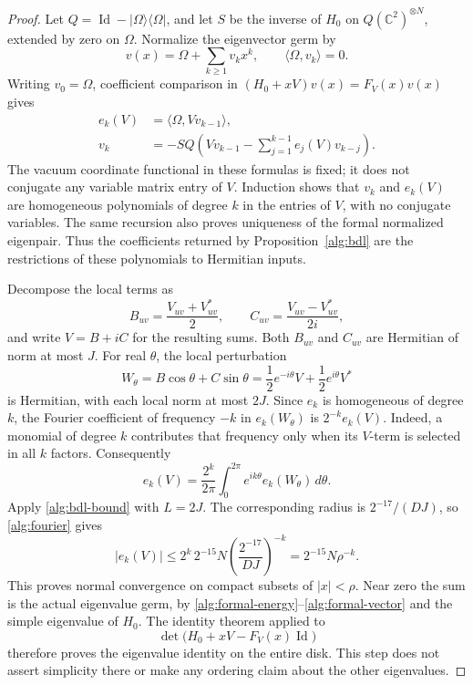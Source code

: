 \documentclass[reqno]{amsart}
\theoremstyle{definition}
\theoremstyle{remark}
\newcommand{\C}{\mathbb C}
\DeclareMathOperator{\Id}{Id}
\begin{document}
\begin{proof}
Let \(Q=\Id-|\Omega\rangle\langle\Omega|\), and let \(S\) be the
inverse of \(H_0\) on \(Q(\C^2)^{\otimes N}\), extended by zero on
\(\Omega\).  Normalize the eigenvector germ by
\[
 v(x)=\Omega+\sum_{k\ge1}v_kx^k,\qquad
 \langle\Omega,v_k\rangle=0.
 \]
Writing \(v_0=\Omega\), coefficient comparison in
\((H_0+xV)v(x)=F_V(x)v(x)\) gives
\begin{align}
 e_k(V)&=\langle\Omega,Vv_{k-1}\rangle,
 \label{alg:formal-energy}\\
 v_k&=-S Q\left(
        Vv_{k-1}-\sum_{j=1}^{k-1}e_j(V)v_{k-j}
       \right).
 \label{alg:formal-vector}
\end{align}
The vacuum coordinate functional in these formulas is fixed; it does
not conjugate any variable matrix entry of \(V\).
Induction shows that \(v_k\) and \(e_k(V)\) are homogeneous
polynomials of degree \(k\) in the entries of \(V\), with no conjugate
variables.  The same recursion also proves uniqueness of the formal
normalized eigenpair.  Thus the coefficients returned by
Proposition~\ref{alg:bdl} are the restrictions of these polynomials
to Hermitian inputs.

Decompose the local terms as
\[
 B_{uv}=\frac{V_{uv}+V_{uv}^*}{2},\qquad
 C_{uv}=\frac{V_{uv}-V_{uv}^*}{2i},
 \]
and write \(V=B+iC\) for the resulting sums.
Both \(B_{uv}\) and \(C_{uv}\) are Hermitian of norm at most \(J\).
For real \(\theta\), the local perturbation
\[
 W_\theta=B\cos\theta+C\sin\theta
 =\frac12 e^{-i\theta}V+\frac12 e^{i\theta}V^*
 \]
is Hermitian, with each local norm at most \(2J\).
Since \(e_k\) is homogeneous of degree \(k\), the Fourier coefficient
of frequency \(-k\) in \(e_k(W_\theta)\) is
\(2^{-k}e_k(V)\).  Indeed, a monomial of degree \(k\) contributes
that frequency only when its \(V\)-term is selected in all \(k\)
factors.  Consequently
\begin{equation}
 e_k(V)=\frac{2^k}{2\pi}
       \int_0^{2\pi} e^{ik\theta}e_k(W_\theta)\,d\theta.
 \label{alg:fourier}
\end{equation}
Apply \eqref{alg:bdl-bound} with \(L=2J\).  The corresponding
radius is \(2^{-17}/(DJ)\), so \eqref{alg:fourier} gives
\[
 |e_k(V)|
 \le 2^k\,2^{-15}N
          \left(\frac{2^{-17}}{DJ}\right)^{-k}
 =2^{-15}N\rho^{-k}.
 \]
This proves normal convergence on compact subsets of \(|x|<\rho\).
Near zero the sum is the actual eigenvalue germ, by
\eqref{alg:formal-energy}--\eqref{alg:formal-vector} and the
simple eigenvalue of \(H_0\).  The identity theorem applied to
\[
 \det\bigl(H_0+xV-F_V(x)\Id\bigr)
 \]
therefore proves the eigenvalue identity on the entire disk.
This step does not assert simplicity there or make any ordering
claim about the other eigenvalues.


\end{proof}
\end{document}
